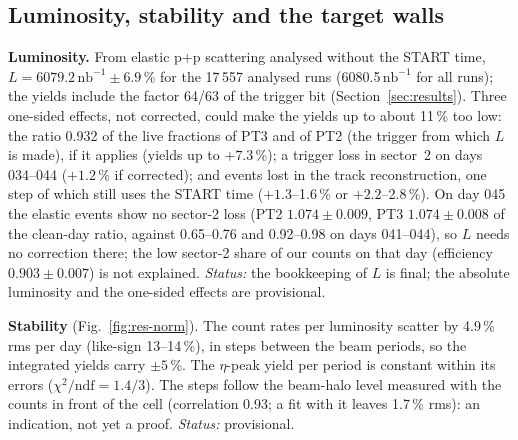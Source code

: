 \documentclass[11pt,a4paper]{article}
\newcommand{\nbinv}{\ensuremath{\mathrm{nb}^{-1}}\xspace}
\begin{document}
\subsection{Luminosity, stability and the target walls}
\label{sec:norm}
\textbf{Luminosity.} From elastic p+p scattering analysed without the START time, $L=6079.2\,\nbinv\pm6.9$\,\% for the 17\,557 analysed runs
(6080.5\,\nbinv for all runs); the yields include the factor 64/63 of the trigger bit (Section~\ref{sec:results}). Three one-sided effects,
not corrected, could make the yields up to about 11\,\% too low: the ratio 0.932 of the live fractions of PT3 and of PT2 (the trigger from
which $L$ is made), if it applies (yields up to $+7.3$\,\%); a trigger loss in sector~2 on days 034--044 ($+1.2$\,\% if corrected); and
events lost in the track reconstruction, one step of which still uses the START time ($+1.3$--1.6\,\% or $+2.2$--2.8\,\%). On day 045 the
elastic events show no sector-2 loss (PT2 $1.074\pm0.009$, PT3 $1.074\pm0.008$ of the clean-day ratio, against 0.65--0.76 and 0.92--0.98 on
days 041--044), so $L$ needs no correction there; the low sector-2 share of our counts on that day (efficiency $0.903\pm0.007$) is not
explained. \emph{Status:} the bookkeeping of $L$ is final; the absolute luminosity and the one-sided effects are provisional.

\textbf{Stability} (Fig.~\ref{fig:res-norm}). The count rates per luminosity scatter by 4.9\,\% rms per day (like-sign 13--14\,\%), in
steps between the beam periods, so the integrated yields carry $\pm5$\,\%. The $\eta$-peak yield per period is constant within its errors
($\chi^2/\mathrm{ndf}=1.4/3$). The steps follow the beam-halo level measured with the counts in front of the cell (correlation 0.93; a fit
with it leaves 1.7\,\% rms): an indication, not yet a proof. \emph{Status:} provisional.
\end{document}
